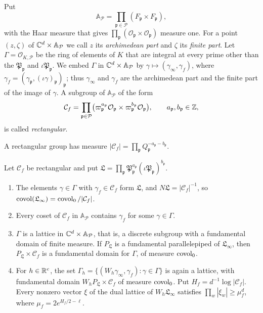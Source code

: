 \begin{definition}\label{fw:finite-coordinates}
Put
\[
 \mathbb A_{\mathcal P}=\prod_{\mathfrak p\in\mathcal P}
 (F_{\mathfrak p}\times F_{\mathfrak p}),
\]
with the Haar measure that gives $\prod_{\mathfrak p}(\mathcal
O_{\mathfrak p}\times\mathcal O_{\mathfrak p})$ measure one. For a point
$(z,\zeta)$ of $\mathbb C^d\times\mathbb A_{\mathcal P}$ we call $z$ its
\emph{archimedean part} and $\zeta$ its \emph{finite part}. Let
$\Gamma=\mathcal O_{K,\mathcal P}$ be the ring of elements of $K$ that
are integral at every prime other than the $\mathfrak P_{\mathfrak p}$
and $\iota\mathfrak P_{\mathfrak p}$. We embed $\Gamma$ in
$\mathbb C^d\times\mathbb A_{\mathcal P}$ by
$\gamma\mapsto(\gamma_\infty,\gamma_f)$, where
$\gamma_f=(\gamma_{\mathfrak p},(\iota\gamma)_{\mathfrak p})_{\mathfrak
p}$; thus $\gamma_\infty$ and $\gamma_f$ are the archimedean part and the
finite part of the image of $\gamma$. A subgroup of $\mathbb A_{\mathcal
P}$ of the form
\[
 \mathcal C_f=\prod_{\mathfrak p\in\mathcal P}\bigl(\varpi_{\mathfrak
 p}^{a_{\mathfrak p}}\mathcal O_{\mathfrak p}\times\varpi_{\mathfrak
 p}^{b_{\mathfrak p}}\mathcal O_{\mathfrak p}\bigr),\qquad
 a_{\mathfrak p},b_{\mathfrak p}\in\mathbb Z,
\]
is called \emph{rectangular}.
\end{definition}

A rectangular group has measure
$|\mathcal C_f|=\prod_{\mathfrak p}Q_{\mathfrak p}^{-a_{\mathfrak
p}-b_{\mathfrak p}}$.

\begin{lemma}\label{fw:lattice}
Let $\mathcal C_f$ be rectangular and put
$\mathfrak L=\prod_{\mathfrak p}\mathfrak P_{\mathfrak p}^{a_{\mathfrak
p}}(\iota\mathfrak P_{\mathfrak p})^{b_{\mathfrak p}}$.
\begin{enumerate}
\item[(a)] The elements $\gamma\in\Gamma$ with $\gamma_f\in\mathcal C_f$
form $\mathfrak L$, and $N\mathfrak L=|\mathcal C_f|^{-1}$, so
$\operatorname{covol}(\mathfrak L_\infty)=\operatorname{covol}_0/|\mathcal C_f|$.
\item[(b)] Every coset of $\mathcal C_f$ in $\mathbb A_{\mathcal P}$
contains $\gamma_f$ for some $\gamma\in\Gamma$.
\item[(c)] $\Gamma$ is a lattice in $\mathbb C^d\times\mathbb A_{\mathcal P}$,
that is, a discrete subgroup with a fundamental domain of finite
measure. If $P_{\mathfrak L}$ is a fundamental parallelepiped of
$\mathfrak L_\infty$, then $P_{\mathfrak L}\times\mathcal C_f$ is a
fundamental domain for $\Gamma$, of measure $\operatorname{covol}_0$.
\item[(d)] For $h\in\mathbb R^c$, the set
$\Gamma_h=\{(W_h\gamma_\infty,\gamma_f):\gamma\in\Gamma\}$ is again a
lattice, with fundamental domain $W_hP_{\mathfrak L}\times\mathcal C_f$
of measure $\operatorname{covol}_0$. Put $H_f=d^{-1}\log|\mathcal C_f|$. Every nonzero
vector $\xi$ of the dual lattice of $W_h\mathfrak L_\infty$ satisfies
$\prod_w|\xi_w|\ge\mu_f^d$, where $\mu_f=2e^{H_f/2-\ell}$.
\end{enumerate}
\end{lemma}

